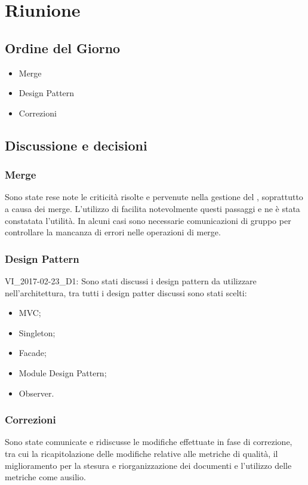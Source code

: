 \section{Riunione}
\subsection{Ordine del Giorno}
\begin{itemize}
	\item Merge
	\item Design Pattern
	\item Correzioni
\end{itemize}

\subsection{Discussione e decisioni}

\subsubsection{Merge}
Sono state rese note le criticità risolte e pervenute nella gestione del , soprattutto a causa dei merge. L'utilizzo di  facilita notevolmente questi passaggi e ne è stata constatata l'utilità. In alcuni casi sono necessarie comunicazioni di gruppo per controllare la mancanza di errori nelle operazioni di merge.

\subsubsection{Design Pattern}
VI_2017-02-23_D1: Sono stati discussi i design pattern da utilizzare nell'architettura, tra tutti i design patter discussi sono stati scelti:
\begin{itemize}
	\item MVC;
	\item Singleton;
	\item Facade;
	\item Module Design Pattern;
	\item Observer.
\end{itemize}

\subsubsection{Correzioni}
Sono state comunicate e ridiscusse le modifiche effettuate in fase di correzione, tra cui la ricapitolazione delle modifiche relative alle metriche di qualità, il miglioramento per la stesura e riorganizzazione dei documenti e l'utilizzo delle metriche come ausilio.


\clearpage
